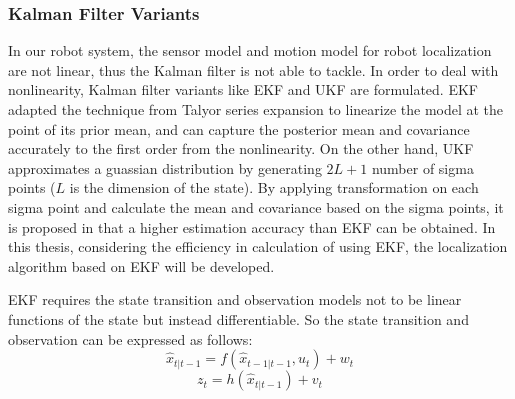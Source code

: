 \subsubsection{Kalman Filter Variants}
In our robot system, the sensor model and motion model for robot localization are not linear, thus the Kalman filter is not able to tackle. In order to deal with nonlinearity, Kalman filter variants like \gls{EKF} and \gls{UKF} are formulated. \gls{EKF} adapted the technique from Talyor series expansion to linearize the model at the point of its prior mean, and can capture the posterior mean and covariance accurately to the first order from the nonlinearity. On the other hand, \gls{UKF} approximates a guassian distribution by generating $2L+1$ number of sigma points ($L$ is the dimension of the state). By applying transformation on each sigma point and calculate the mean and covariance based on the sigma points, it is proposed in \cite{Wan2000} that a higher estimation accuracy than \gls{EKF} can be obtained. In this thesis, considering the efficiency in calculation of using \gls{EKF}, the localization algorithm based on \gls{EKF} will be developed.

\gls{EKF} requires the state transition and observation models not to be linear functions of the state but instead differentiable. So the state transition and observation can be expressed as follows: 
\begin{equation}
\hat{x}_{t|t-1} = f(\hat{x}_{t-1|t-1}, u_{t}) + w_{t} 
  \label{eq:trans}
\end{equation}
\begin{equation}
z_{t} = h(\hat{x}_{t|t-1}) + v_{t}
  \label{eq:observ}
\end{equation}

